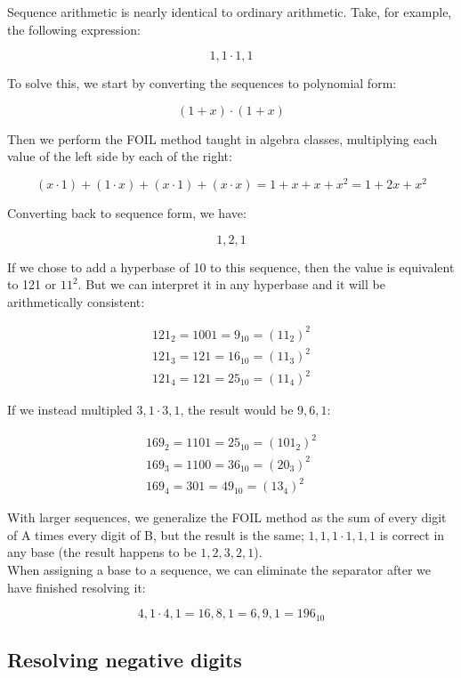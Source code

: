 \documentclass{article}
\begin{document}
\noindent Sequence arithmetic is nearly identical to ordinary arithmetic. Take, for example, the following expression:

$$1,1 \cdot 1,1$$

\noindent To solve this, we start by converting the sequences to polynomial form:

$$(1 + x) \cdot (1 + x)$$

\noindent Then we perform the FOIL method taught in algebra classes, multiplying each value of the left side by each of the right:

$$(x \cdot 1) + (1 \cdot x) + (x \cdot 1) + (x \cdot x) = 1 + x + x + x^2 = 1 + 2x + x^2$$

\noindent Converting back to sequence form, we have:

$$1, 2, 1$$

\noindent If we chose to add a hyperbase of 10 to this sequence, then the value is equivalent to 121 or $11^2$. But we can interpret it in any hyperbase and it will be arithmetically consistent:

\begin{align*}
121_2 = 1001 = 9_{10} = (11_2)^2\\
121_3 = 121 = 16_{10} = (11_3)^2\\
121_4 = 121 = 25_{10} = (11_4)^2
\end{align*}

\noindent If we instead multipled $3,1 \cdot 3,1$, the result would be $9,6,1$:

\begin{align*}
169_2 = 1101 = 25_{10} = (101_2)^2\\
169_3 = 1100 = 36_{10} = (20_3)^2\\
169_4 = 301 = 49_{10} = (13_4)^2
\end{align*}

\noindent With larger sequences, we generalize the FOIL method as the sum of every digit of A times every digit of B, but the result is the same; $1, 1, 1 \cdot 1,1,1$ is correct in any base (the result happens to be $1,2,3,2,1$).\\

\noindent When assigning a base to a sequence, we can eliminate the separator after we have finished resolving it:

$$4,1 \cdot 4,1 = 16,8,1 = 6,9,1 = 196_{10}$$

\subsection*{Resolving negative digits}
\end{document}
